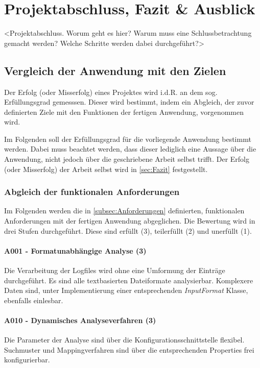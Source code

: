 
\chapter{Projektabschluss, Fazit \& Ausblick}\label{cha:Schlussbetrachtung}
<Projektabschluss. Worum geht es hier? Warum muss eine Schlussbetrachtung gemacht werden? Welche Schritte werden dabei durchgeführt?>

\section{Vergleich der Anwendung mit den Zielen}
Der Erfolg (oder Misserfolg) eines Projektes wird i.d.R. an dem sog. Erfüllungsgrad gemesssen. Dieser wird bestimmt, indem ein Abgleich, der zuvor definierten Ziele mit den Funktionen der fertigen Anwendung, vorgenommen wird.

Im Folgenden soll der Erfüllungsgrad für die vorliegende Anwendung bestimmt werden. Dabei muss beachtet werden, dass dieser lediglich eine Aussage über die Anwendung, nicht jedoch über die geschriebene Arbeit selbst trifft. Der Erfolg (oder Misserfolg) der Arbeit selbst wird in \autoref{sec:Fazit} festgestellt.

\subsection{Abgleich der funktionalen Anforderungen}
Im Folgenden werden die in \autoref{subsec:Anforderungen} definierten, funktionalen Anforderungen mit der fertigen Anwendung abgeglichen. Die Bewertung wird in drei Stufen durchgeführt. Diese sind erfüllt (3), teilerfüllt (2) und unerfüllt (1).

\subsubsection{A001 - Formatunabhängige Analyse (3)}
Die Verarbeitung der Logfiles wird ohne eine Umformung der Einträge durchgeführt. Es sind alle textbasierten Dateiformate analysierbar. Komplexere Daten sind, unter Implementierung einer entsprechenden \textit{InputFormat} Klasse, ebenfalls einlesbar.

\subsubsection{A010 - Dynamisches Analyseverfahren (3)}
Die Parameter der Analyse sind über die Konfigurationsschnittstelle flexibel. Suchmuster und Mappingverfahren sind über die entsprechenden Properties frei konfigurierbar.


